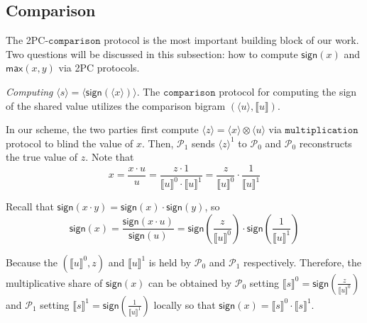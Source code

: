 \documentclass[letterpaper]{article} %
\begin{document}
    \subsection{Comparison}
    The 2PC-$\mathtt{comparison}$ protocol is the most important building block of our work.
    Two questions will be discussed in this subsection:
    how to compute $\mathsf{sign}(x)$ and $\mathsf{max}(x,y)$ via 2PC protocols.


    \emph{Computing} $\langle s\rangle  = \langle \mathsf{sign}(\langle x\rangle)\rangle $.
    The $\mathtt{comparison}$ protocol for computing the sign of the shared value utilizes the comparison bigram $(\langle u\rangle,\llbracket u \rrbracket )$.

    In our scheme, the two parties first compute $ \langle z\rangle = \langle x\rangle\otimes \langle u\rangle$
    via $\mathtt{multiplication}$ protocol
    to blind the value of $x$.
    Then, $\mathcal{P}_{1}$ sends  $ \langle z\rangle^{1}$ to $\mathcal{P}_{0}$ and
    $\mathcal{P}_{0}$ reconstructs the true value of $z$.
    Note that
    $$x=\frac{x\cdot u}{u}
        =\frac{z\cdot 1}{\llbracket u \rrbracket^{0}\cdot \llbracket u \rrbracket^{1}}
        =\frac{z}{\llbracket u \rrbracket^{0}}\cdot\frac{1}{\llbracket u \rrbracket^{1}}$$

    Recall that $\mathsf{sign}(x\cdot y)=\mathsf{sign}(x)\cdot \mathsf{sign}(y)$, so
    $$\mathsf{sign}(x)=\frac{\mathsf{sign}(x \cdot u)}{\mathsf{sign}(u)}
    =\mathsf{sign}(\frac{z}{\llbracket u \rrbracket^{0}})
    \cdot \mathsf{sign}(\frac{1}{\llbracket u \rrbracket^{1}})$$

    Because the $(\llbracket u \rrbracket^{0},z)$ and $\llbracket u \rrbracket^{1}$
    is held by $\mathcal{P}_{0}$ and $\mathcal{P}_{1}$ respectively.
    Therefore, the multiplicative share of $\mathsf{sign}(x)$ can be obtained by
    $\mathcal{P}_{0}$ setting $\llbracket s \rrbracket^{0}
    =\mathsf{sign}(\frac{z}{\llbracket u \rrbracket^{0}})$
    and $\mathcal{P}_{1}$ setting $\llbracket s \rrbracket^{1}
    =\mathsf{sign}(\frac{1}{\llbracket u \rrbracket^{1}})$ locally
    so that $\mathsf{sign}(x)=\llbracket s \rrbracket^{0}\cdot \llbracket s \rrbracket^{1}$.
\end{document}

